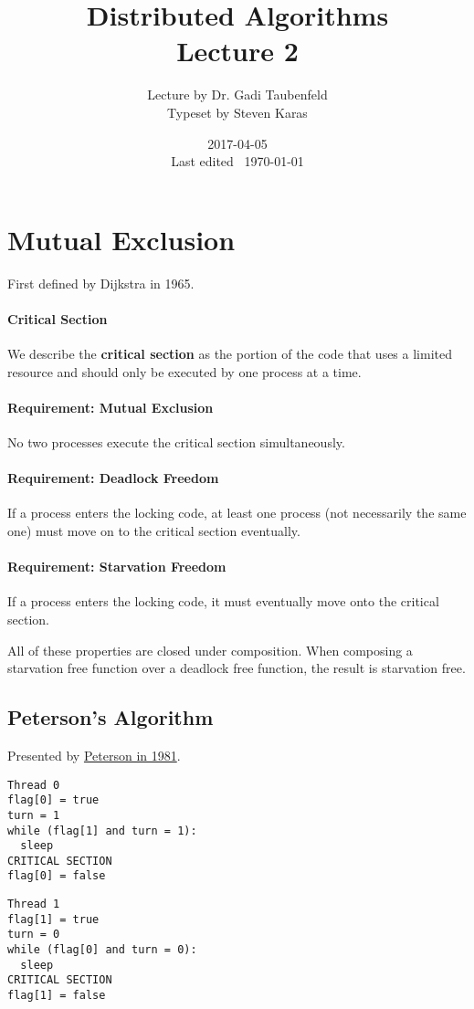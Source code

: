 \documentclass[a4paper]{article}
\title{Distributed Algorithms\\\large Lecture 2}
\date{2017-04-05 \\ Last edited \currenttime\ \today}
\author{Lecture by Dr. Gadi Taubenfeld\\Typeset by Steven Karas}
\begin{document}
\maketitle

\section{Mutual Exclusion}

First defined by Dijkstra in 1965.

\paragraph{Critical Section}
We describe the \textbf{critical section} as the portion of the code that uses a limited resource and should only be executed by one process at a time.

\paragraph{Requirement: Mutual Exclusion}
No two processes execute the critical section simultaneously.

\paragraph{Requirement: Deadlock Freedom}
If a process enters the locking code, at least one process (not necessarily the same one) must move on to the critical section eventually.

\paragraph{Requirement: Starvation Freedom}
If a process enters the locking code, it must eventually move onto the critical section.

All of these properties are closed under composition.
When composing a starvation free function over a deadlock free function, the result is starvation free.

\subsection{Peterson's Algorithm}

Presented by \href{http://cs.nyu.edu/~lerner/spring12/Read03-MutualExclusion.pdf}{Peterson in 1981}.

\noindent\begin{minipage}{.45\textwidth}
\begin{lstlisting}[frame=L]
Thread 0
flag[0] = true
turn = 1
while (flag[1] and turn = 1):
  sleep
CRITICAL SECTION
flag[0] = false
\end{lstlisting}
\end{minipage}\hfill
\begin{minipage}{.45\textwidth}
\begin{lstlisting}[frame=L]
Thread 1
flag[1] = true
turn = 0
while (flag[0] and turn = 0):
  sleep
CRITICAL SECTION
flag[1] = false
\end{lstlisting}
\end{minipage}
\end{document}
